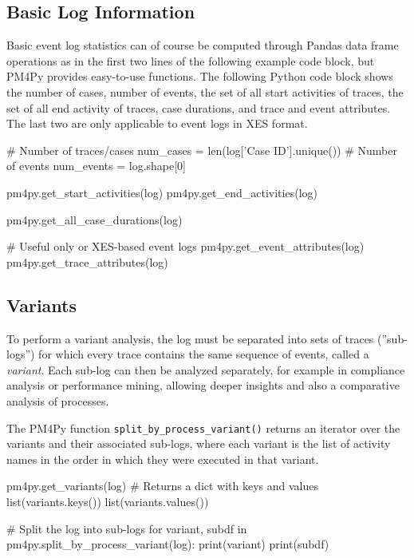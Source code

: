 \begin{withcode}
\subsection*{Basic Log Information}

Basic event log statistics can of course be computed through Pandas data frame operations as in the first two lines of the following example code block, but PM4Py provides easy-to-use functions. The following Python code block shows the number of cases, number of events, the set of all start activities of traces, the set of all end activity of traces, case durations, and trace and event attributes. The last two are only applicable to event logs in XES format.

\begin{pythoncode}
# Number of traces/cases
num_cases = len(log['Case ID'].unique())
# Number of events
num_events = log.shape[0]

pm4py.get_start_activities(log)
pm4py.get_end_activities(log)

pm4py.get_all_case_durations(log)

# Useful only or XES-based event logs
pm4py.get_event_attributes(log)
pm4py.get_trace_attributes(log)
\end{pythoncode}
\end{withcode}

\subsection*{Variants}

To perform a variant analysis, the log must be separated into sets of traces (''sub-logs'') for which every trace contains the same sequence of events, called a \emph{variant}. Each sub-log can then be analyzed separately, for example in compliance analysis or performance mining, allowing deeper insights and also a comparative analysis of processes. 
\begin{withcode}
The PM4Py function \texttt{split\_by\_process\_variant()} returns an iterator over the variants and their associated sub-logs, where each variant is the list of activity names in the order in which they were executed in that variant. 

\begin{pythoncode}
pm4py.get_variants(log)
# Returns a dict with keys and values
list(variants.keys())
list(variants.values())

# Split the log into sub-logs
for variant, subdf in pm4py.split_by_process_variant(log):
    print(variant)
    print(subdf)  
\end{pythoncode}
\end{withcode}

